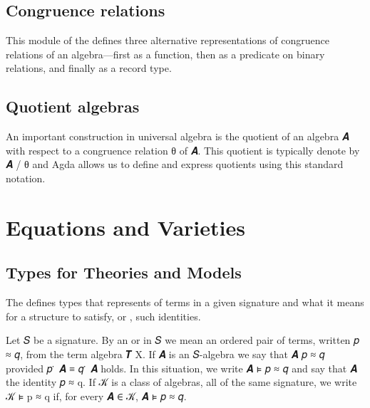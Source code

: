 \documentclass[a4paper,UKenglish,cleveref,autoref,thm-restate]{lipics-v2021}
\begin{document}
\subsection{Congruence relations}\label{ssec:congr-relat}
This \ualibCongruences module of the \agdaualib defines 
three alternative representations of congruence relations of an algebra---first as a function, then as a predicate on binary relations, and finally as a record type.
\ccpad
\begin{code}%
  
\end{code}







\subsection{Quotient algebras}\label{ssec:quotient-algebras}
An important construction in universal algebra is the quotient of an algebra \ab 𝑨 with respect to a congruence relation \ab θ of \ab 𝑨. This quotient is typically denote by \ab 𝑨 \as / \ab θ and Agda allows us to define and express quotients using this standard notation.
\ccpad
\begin{code}%
  
\end{code}












\section{Equations and Varieties}\label{sec:equations-and-varieties}

\subsection{Types for Theories and Models}\label{ssec:types-for-theories-and-models}
The \agdaualib defines types that represents  of terms in a given signature and what it means for a structure to satisfy, or , such identities.

Let \ab 𝑆 be a signature. By an  or  in \ab 𝑆 we mean an ordered pair of terms, written \ab 𝑝 \aof ≈ \ab 𝑞, from the term algebra \af 𝑻 \ab X. If \ab 𝑨 is an \ab 𝑆-algebra we say that \ab 𝑨  \ab 𝑝 \aof ≈ \ab 𝑞 provided \ab 𝑝 \af ̇ \ab 𝑨 \aod ≡ \ab 𝑞 \aof ̇ \ab 𝑨 holds. In this situation, we write \ab 𝑨 \aof ⊧ \ab 𝑝 \aof ≈ \ab 𝑞 and say that \ab 𝑨  the identity \ab 𝑝 \aof ≈ \ab q. If \ab 𝒦 is a class of algebras, all of the same signature, we write \ab 𝒦 \aof ⊧ \ab p \aof ≈ \ab q if, for every \ab 𝑨 \aof ∈ \ab 𝒦, \ab 𝑨 \aof ⊧ \ab 𝑝 \aof ≈ \ab 𝑞.
\end{document}

